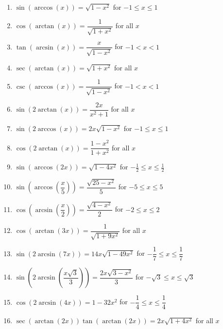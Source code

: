 \begin{enumerate}

\setcounter{enumi}{\value{HW}}

\item $\sin \left( \arccos \left( x \right) \right) = \sqrt{1 - x^{2}}$  for $-1 \leq x \leq 1$
\item $\cos \left( \arctan \left( x \right) \right) = \dfrac{1}{\sqrt{1 + x^{2}}}$ for all $x$
\item $\tan \left( \arcsin \left( x \right) \right) = \dfrac{x}{\sqrt{1 - x^{2}}}$  for $-1 < x < 1$
\item $\sec \left( \arctan \left( x \right) \right) = \sqrt{1 + x^{2}}$ for all $x$
\item $\csc \left( \arccos \left( x \right) \right) = \dfrac{1}{\sqrt{1 - x^{2}}}$ for $-1 < x < 1$
\item $\sin \left( 2\arctan \left( x \right) \right) = \dfrac{2x}{x^{2} + 1}$ for all $x$
\item $\sin \left( 2\arccos \left( x \right) \right) = 2x\sqrt{1-x^2}$  for $-1 \leq x \leq 1$
\item $\cos \left( 2\arctan \left( x \right) \right) = \dfrac{1 - x^{2}}{1 + x^{2}}$ for all $x$
\item  $\sin(\arccos(2x)) = \sqrt{1-4x^2}$ for $-\frac{1}{2} \leq x \leq \frac{1}{2}$
\item  $\sin\left(\arccos\left(\dfrac{x}{5}\right)\right) = \dfrac{\sqrt{25-x^2}}{5}$ for $-5 \leq x \leq 5$
\item  $\cos\left(\arcsin\left(\dfrac{x}{2}\right)\right) = \dfrac{\sqrt{4-x^2}}{2}$ for $-2 \leq x \leq 2$
\item  $\cos\left(\arctan\left(3x\right)\right) = \dfrac{1}{\sqrt{1+9x^{2}}}$ for all $x$
\item  $\sin(2\arcsin(7x)) = 14x \sqrt{1-49x^2}$ for $-\dfrac{1}{7} \leq x \leq \dfrac{1}{7}$
\item  $\sin\left(2 \arcsin\left( \dfrac{x\sqrt{3}}{3} \right) \right) = \dfrac{2x\sqrt{3-x^2}}{3}$ for $-\sqrt{3} \leq x \leq \sqrt{3}$
\item  $\cos(2 \arcsin(4x)) = 1 - 32x^2$ for $-\dfrac{1}{4} \leq x \leq \dfrac{1}{4}$
\item  $\sec(\arctan(2x))\tan(\arctan(2x)) = 2x \sqrt{1+4x^2}$ for all $x$



\end{enumerate}
